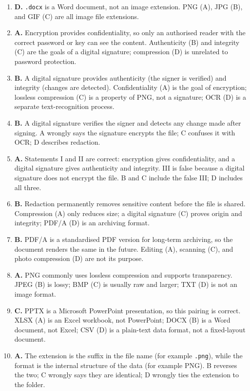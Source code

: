 \documentclass[11pt]{article}
\begin{document}
\begin{enumerate}[label=\textbf{Q\arabic*.}, leftmargin=*]
  are formatted Office formats; PDF (D) is a fixed-layout format.
\item \textbf{D.} \texttt{.docx} is a Word document, not an image extension.
  PNG (A), JPG (B), and GIF (C) are all image file extensions.
\item \textbf{A.} Encryption provides confidentiality, so only an authorised
  reader with the correct password or key can see the content. Authenticity
  (B) and integrity (C) are the goals of a digital signature; compression (D)
  is unrelated to password protection.
\item \textbf{B.} A digital signature provides authenticity (the signer is
  verified) and integrity (changes are detected). Confidentiality (A) is the
  goal of encryption; lossless compression (C) is a property of PNG, not a
  signature; OCR (D) is a separate text-recognition process.
\item \textbf{B.} A digital signature verifies the signer and detects any
  change made after signing. A wrongly says the signature encrypts the file;
  C confuses it with OCR; D describes redaction.
\item \textbf{A.} Statements I and II are correct: encryption gives
  confidentiality, and a digital signature gives authenticity and integrity.
  III is false because a digital signature does not encrypt the file. B and C
  include the false III; D includes all three.
\item \textbf{B.} Redaction permanently removes sensitive content before the
  file is shared. Compression (A) only reduces size; a digital signature (C)
  proves origin and integrity; PDF/A (D) is an archiving format.
\item \textbf{B.} PDF/A is a standardised PDF version for long-term
  archiving, so the document renders the same in the future. Editing (A),
  scanning (C), and photo compression (D) are not its purpose.
\item \textbf{A.} PNG commonly uses lossless compression and supports
  transparency. JPEG (B) is lossy; BMP (C) is usually raw and larger; TXT (D)
  is not an image format.
\item \textbf{C.} PPTX is a Microsoft PowerPoint presentation, so this pairing
  is correct. XLSX (A) is an Excel workbook, not PowerPoint; DOCX (B) is a
  Word document, not Excel; CSV (D) is a plain-text data format, not a
  fixed-layout document.
\item \textbf{A.} The extension is the suffix in the file name (for example
  \texttt{.png}), while the format is the internal structure of the data
  (for example PNG). B reverses the two; C wrongly says they are identical;
  D wrongly ties the extension to the folder.


\end{enumerate}
\end{document}

